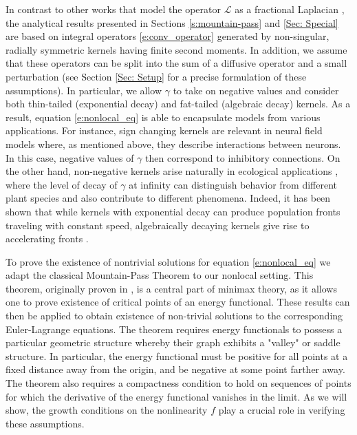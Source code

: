 \documentclass[11pt]{amsart}   	%
\theoremstyle{plain}
\numberwithin{equation}{section}
\begin{document}
In contrast to other works that model the operator $\mathcal{L}$ as a fractional Laplacian \cite{chammem2023combined, dipierro2017fractional, gu2018infinitely, servadei2012mountain}, the analytical results presented in Sections \ref{s:mountain-pass} and \ref{Sec: Special} are based on integral operators \eqref{e:conv_operator}  generated by non-singular, radially symmetric kernels having finite second moments. In addition, we assume that these operators can be split into the sum of a diffusive operator and a small perturbation (see Section \ref{Sec: Setup} for a precise formulation of these assumptions). In particular, we allow $\gamma$ to take on negative values and consider both thin-tailed (exponential decay) and fat-tailed (algebraic decay) kernels. As a result,  equation \eqref{e:nonlocal_eq} is able to encapsulate models from various applications. For instance, sign changing kernels are relevant in neural field models where, as mentioned above, they describe interactions between neurons. In this case, negative values of $\gamma$ then correspond to inhibitory connections. On the other hand, non-negative kernels arise  naturally in ecological applications \cite{bullock2017}, where the level of decay of $\gamma$ at infinity can distinguish behavior from different plant species and also contribute to different phenomena. Indeed, it has been shown that while kernels with exponential decay can produce population fronts traveling with constant speed, algebraically decaying kernels give rise to accelerating fronts \cite{henderson2018}.



To prove the existence of nontrivial solutions for equation \eqref{e:nonlocal_eq} we adapt the classical Mountain-Pass Theorem to our nonlocal setting. This theorem, originally proven in \cite{rabinowitz1982mountain}, is a central part of minimax theory, as it allows one to prove existence of critical points of an energy functional. These results can then be applied to obtain  existence of non-trivial solutions to the corresponding Euler-Lagrange equations. The  theorem requires energy functionals to possess a particular geometric structure whereby their graph exhibits a "valley" or saddle structure. In particular, the energy functional must be positive for all points at a fixed distance away from the origin, and be negative at some point farther away. The theorem also requires a compactness condition  to hold on sequences of points for which the derivative of the energy functional vanishes in the limit. As we will show, the growth conditions on the nonlinearity $f$ play a crucial role in verifying these assumptions.
\end{document}
